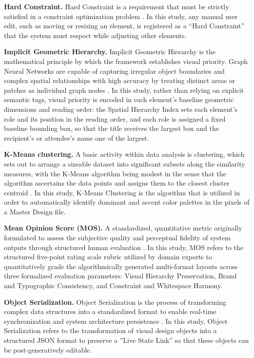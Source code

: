 \begin{refsection}
    \textbf{Hard Constraint.} Hard Constraint is a requirement that must be strictly satisfied in a constraint optimization problem \cite{Williams&Robbins2001}. In this study, any manual user edit, such as moving or resizing an element, is registered as a “Hard Constraint” that the system must respect while adjusting other elements.

    \textbf{Implicit Geometric Hierarchy.} Implicit Geometric Hierarchy is the mathematical principle by which the framework establishes visual priority. Graph Neural Networks are capable of capturing irregular object boundaries and complex spatial relationships with high accuracy by treating distinct areas or patches as individual graph nodes \cite{Han2022VisionGNN, Jiang2024Graph4GUI}. In this study, rather than relying on explicit semantic tags, visual priority is encoded in each element's baseline geometric dimensions and reading order: the Spatial Hierarchy Index sets each element's role and its position in the reading order, and each role is assigned a fixed baseline bounding box, so that the title receives the largest box and the recipient's or attendee's name one of the largest.

    \textbf{K-Means clustering.} A basic activity within data analysis is clustering, which sets out to arrange a sizeable dataset into significant subsets along the similarity measures, with the K-Means algorithm being modest in the sense that the algorithm ascertains the data points and assigns them to the closest cluster centroid \cite{Lertrusdachakul2025Hybrid}. In this study, K-Means Clustering is the algorithm that is utilized in order to automatically identify dominant and accent color palettes in the pixels of a Master Design file.

    \textbf{Mean Opinion Score (MOS).} A standardized, quantitative metric originally formulated to assess the subjective quality and perceptual fidelity of system outputs through structured human evaluation \cite{itut1996p800}. In this study, MOS refers to the structured five-point rating scale rubric utilized by domain experts to quantitatively grade the algorithmically generated multi-format layouts across three formalized evaluation parameters: Visual Hierarchy Preservation, Brand and Typographic Consistency, and Constraint and Whitespace Harmony.

    \textbf{Object Serialization.} Object Serialization is the process of transforming complex data structures into a standardized format to enable real-time synchronization and system architecture persistence \cite{WikipediaSerialization2026}. In this study, Object Serialization refers to the transformation of visual design objects into a structured JSON format to preserve a ”Live State Link” so that these objects can be post-generatively editable.


\end{refsection}
